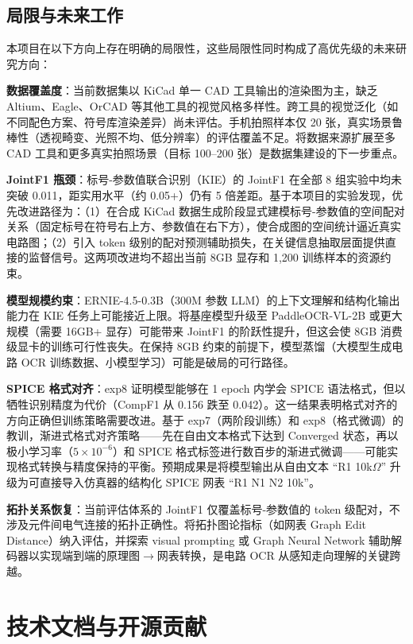 \subsection{局限与未来工作}

本项目在以下方向上存在明确的局限性，这些局限性同时构成了高优先级的未来研究方向：

\textbf{数据覆盖度}：当前数据集以 KiCad 单一 CAD 工具输出的渲染图为主，缺乏 Altium、Eagle、OrCAD 等其他工具的视觉风格多样性。跨工具的视觉泛化（如不同配色方案、符号库渲染差异）尚未评估。手机拍照样本仅 20 张，真实场景鲁棒性（透视畸变、光照不均、低分辨率）的评估覆盖不足。将数据来源扩展至多 CAD 工具和更多真实拍照场景（目标 100--200 张）是数据集建设的下一步重点。

\textbf{JointF1 瓶颈}：标号-参数值联合识别（KIE）的 JointF1 在全部 8 组实验中均未突破 0.011，距实用水平（约 0.05+）仍有 5 倍差距。基于本项目的实验发现，优先改进路径为：（1）在合成 KiCad 数据生成阶段显式建模标号-参数值的空间配对关系（固定标号在符号右上方、参数值在右下方），使合成图的空间统计逼近真实电路图；（2）引入 token 级别的配对预测辅助损失，在关键信息抽取层面提供直接的监督信号。这两项改进均不超出当前 8GB 显存和 1,200 训练样本的资源约束。

\textbf{模型规模约束}：ERNIE-4.5-0.3B（300M 参数 LLM）的上下文理解和结构化输出能力在 KIE 任务上可能接近上限。将基座模型升级至 PaddleOCR-VL-2B 或更大规模（需要 16GB+ 显存）可能带来 JointF1 的阶跃性提升，但这会使 8GB 消费级显卡的训练可行性丧失。在保持 8GB 约束的前提下，模型蒸馏（大模型生成电路 OCR 训练数据、小模型学习）可能是破局的可行路径。

\textbf{SPICE 格式对齐}：exp8 证明模型能够在 1 epoch 内学会 SPICE 语法格式，但以牺牲识别精度为代价（CompF1 从 0.156 跌至 0.042）。这一结果表明格式对齐的方向正确但训练策略需要改进。基于 exp7（两阶段训练）和 exp8（格式微调）的教训，渐进式格式对齐策略——先在自由文本格式下达到 Converged 状态，再以极小学习率（$5\times10^{-6}$）和 SPICE 格式标签进行数百步的渐进式微调——可能实现格式转换与精度保持的平衡。预期成果是将模型输出从自由文本 ``R1 10k$\Omega$'' 升级为可直接导入仿真器的结构化 SPICE 网表 ``R1 N1 N2 10k''。

\textbf{拓扑关系恢复}：当前评估体系的 JointF1 仅覆盖标号-参数值的 token 级配对，不涉及元件间电气连接的拓扑正确性。将拓扑图论指标（如网表 Graph Edit Distance）纳入评估，并探索 visual prompting 或 Graph Neural Network 辅助解码器以实现端到端的原理图$\to$网表转换，是电路 OCR 从感知走向理解的关键跨越。

\section{技术文档与开源贡献}


